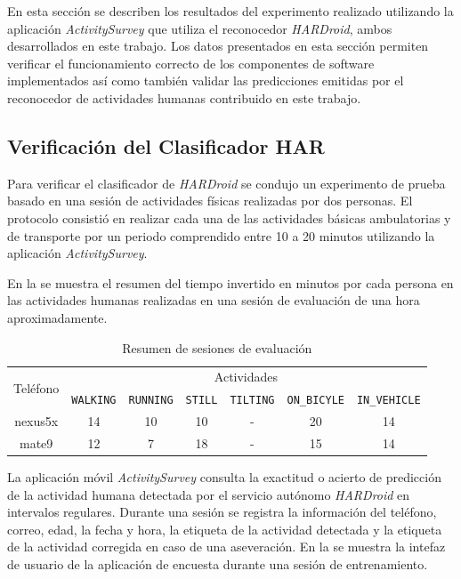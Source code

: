 \label{sec6:resultados}En esta sección se describen los resultados
del experimento realizado utilizando la aplicación \emph{ActivitySurvey}
que utiliza el reconocedor \emph{HARDroid}, ambos desarrollados en
este trabajo. Los datos presentados en esta sección permiten verificar
el funcionamiento correcto de los componentes de software implementados
así como también validar las predicciones emitidas por el reconocedor
de actividades humanas contribuido en este trabajo.

\subsection{Verificación del Clasificador HAR}

Para verificar el clasificador  de \emph{HARDroid }se condujo
un experimento de prueba basado en una sesión de actividades físicas
realizadas por dos personas. El protocolo consistió en realizar cada
una de las actividades básicas ambulatorias y de transporte por un
periodo comprendido entre 10 a 20 minutos utilizando la aplicación
\emph{ActivitySurvey}. 

En la  se muestra el resumen del tiempo invertido
en minutos por cada persona en las actividades humanas realizadas
en una sesión de evaluación de una hora aproximadamente.

\begin{table}[th]
\begin{centering}
\begin{tabular}{|c|c|c|c|c|c|c|}
\hline 
\multirow{2}{*}{Teléfono} & \multicolumn{6}{c|}{Actividades}\tabularnewline
\cline{2-7} 
 & \texttt{\footnotesize{}WALKING} & \texttt{\footnotesize{}RUNNING} & \texttt{\footnotesize{}STILL} & \texttt{\footnotesize{}TILTING} & \texttt{\footnotesize{}ON\_BICYLE} & \texttt{\footnotesize{}IN\_VEHICLE}\tabularnewline
\hline 
\hline 
nexus5x & 14 & 10 & 10 & - & 20 & 14\tabularnewline
\hline 
mate9 & 12 & 7 & 18 & - & 15 & 14\tabularnewline
\hline 
\end{tabular}
\par\end{centering}
\caption{\label{tab6:vsesiones}Resumen de sesiones de evaluación}
\end{table}

La aplicación móvil \emph{ActivitySurvey} consulta la exactitud o
acierto de predicción de la actividad humana detectada por el servicio
autónomo \emph{HARDroid} en intervalos regulares. Durante una sesión
se registra la información del teléfono, correo, edad, la fecha y
hora, la etiqueta de la actividad detectada y la etiqueta de la actividad
corregida en caso de una aseveración. En la 
se muestra la intefaz de usuario de la aplicación de encuesta durante
una sesión de entrenamiento.

